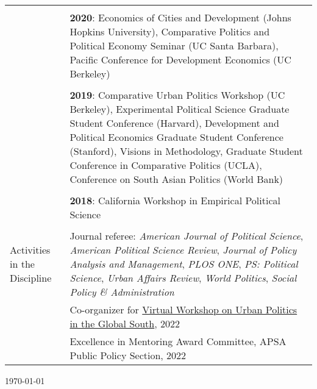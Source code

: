 \documentclass[letterpaper, 10pt]{article}
\begin{document}
\begin{longtable}{p{1in}p{5.5in}}
 &\\
 &\textbf{2020}: Economics of Cities and Development (Johns Hopkins University), Comparative Politics and Political Economy Seminar (UC Santa Barbara), Pacific Conference for Development Economics (UC Berkeley) \\
 &\\


 &\textbf{2019}: Comparative Urban Politics Workshop (UC Berkeley), Experimental Political Science Graduate Student Conference (Harvard), Development and Political Economics Graduate Student Conference (Stanford), Visions in Methodology, Graduate Student Conference in Comparative Politics (UCLA), Conference on South Asian Politics (World Bank)\\
 
 &\\
 &\textbf{2018}: California Workshop in Empirical Political Science
\\
 &\\
 

 

\nohyphens{{Activities in the Discipline}}&Journal referee: \textit{American Journal of Political Science}, \textit{American Political Science Review}, \textit{Journal of Policy Analysis and Management}, \textit{PLOS ONE}, \textit{PS: Political Science}, \textit{Urban Affairs Review}, \textit{World Politics}, \textit{Social Policy \& Administration}\\ 
 & Co-organizer for \href{https://www.globalsouthurbanpols.com}{Virtual Workshop on Urban Politics in the Global South}, 2022\\


&Excellence in Mentoring Award Committee, APSA Public Policy Section, 2022 \\






\end{longtable}
\vspace*{\fill}
\flushright \monthyeardate\today 
\end{document}
